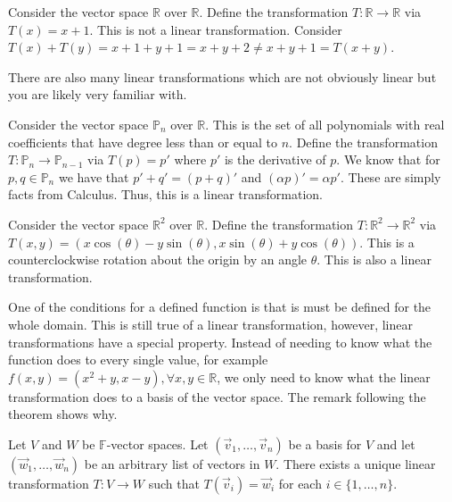 \begin{example}
    Consider the vector space $\mathbb{R}$ over $\mathbb{R}$. Define the transformation $T:\mathbb{R}\to\mathbb{R}$ via $T(x)=x+1$. This is not a linear transformation. Consider $T(x)+T(y)=x+1+y+1=x+y+2\neq x+y+1=T(x+y)$.
\end{example}
There are also many linear transformations which are not obviously linear but you are likely very familiar with.
\begin{example}
    Consider the vector space $\mathbb{P}_n$ over $\mathbb{R}$. This is the set of all polynomials with real coefficients that have degree less than or equal to $n$. Define the transformation $T:\mathbb{P}_n\to\mathbb{P}_{n-1}$ via $T(p)=p'$ where $p'$ is the derivative of $p$. We know that for $p, q\in\mathbb{P}_n$ we have that $p'+q'=(p+q)'$ and $(\alpha p)'=\alpha p'$. These are simply facts from Calculus. Thus, this is a linear transformation.
\end{example}
\begin{example}
    Consider the vector space $\mathbb{R}^2$ over $\mathbb{R}$. Define the transformation $T:\mathbb{R}^2\to\mathbb{R}^2$ via $T(x,y)=(x\cos(\theta)-y\sin(\theta),x\sin(\theta)+y\cos(\theta))$. This is a counterclockwise rotation about the origin by an angle $\theta$. This is also a linear transformation.
\end{example}
One of the conditions for a defined function is that is must be defined for the whole domain. This is still true of a linear transformation, however, linear transformations have a special property. Instead of needing to know what the function does to every single value, for example $f(x,y)=(x^2+y, x-y), \forall x,y\in\mathbb{R}$, we only need to know what the linear transformation does to a basis of the vector space. The remark following the theorem shows why.
\newpage
\begin{theorem}
    Let $V$ and $W$ be $\mathbb{F}$-vector spaces. Let $(\vec{v}_1,\ldots,\vec{v}_n)$ be a basis for $V$ and let $(\vec{w}_1,\ldots,\vec{w}_n)$ be an arbitrary list of vectors in $W$. There exists a unique linear transformation $T:V\to W$ such that $T(\vec{v}_i)=\vec{w}_i$ for each $i\in\{1,\ldots, n\}$.
\end{theorem}
